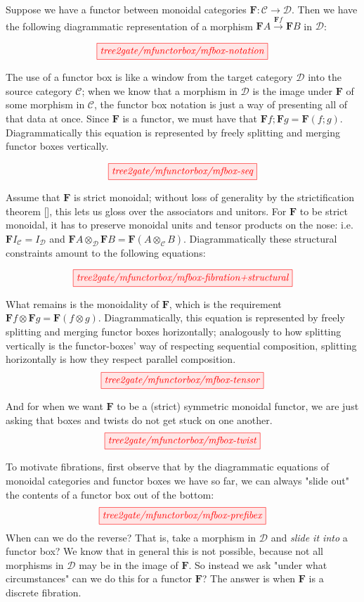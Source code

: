\begin{fullwidth}
Suppose we have a functor between monoidal categories $\mathbf{F}: \mathcal{C} \rightarrow \mathcal{D}$. Then we have the following diagrammatic representation of a morphism $\mathbf{F}A \overset{\mathbf{F}f}{\rightarrow} \mathbf{F}B$ in $\mathcal{D}$:

\[\tikzfig{tree2gate/mfunctorbox/mfbox-notation}\]

The use of a functor box is like a window from the target category $\mathcal{D}$ into the source category $\mathcal{C}$; when we know that a morphism in $\mathcal{D}$ is the image under $\mathbf{F}$ of some morphism in $\mathcal{C}$, the functor box notation is just a way of presenting all of that data at once. Since $\mathbf{F}$ is a functor, we must have that $\mathbf{F}f ; \mathbf{F}g = \mathbf{F}(f;g)$. Diagrammatically this equation is represented by freely splitting and merging functor boxes vertically.

\[\tikzfig{tree2gate/mfunctorbox/mfbox-seq}\]

Assume that $\mathbf{F}$ is strict monoidal; without loss of generality by the strictification theorem [], this lets us gloss over the associators and unitors. For $\mathbf{F}$ to be strict monoidal, it has to preserve monoidal units and tensor products on the nose: i.e. $\mathbf{F}I_\mathcal{C} = I_\mathcal{D}$ and $\mathbf{F}A \otimes_\mathcal{D} \mathbf{F}B = \mathbf{F}(A \otimes_\mathcal{C} B)$. Diagrammatically these structural constraints amount to the following equations:

\[\tikzfig{tree2gate/mfunctorbox/mfbox-fibration+structural}\]

What remains is the monoidality of $\mathbf{F}$, which is the requirement $\mathbf{F}f \otimes \mathbf{F}g = \mathbf{F}(f \otimes g)$. Diagrammatically, this equation is represented by freely splitting and merging functor boxes horizontally; analogously to how splitting vertically is the functor-boxes' way of respecting sequential composition, splitting horizontally is how they respect parallel composition.
\[\tikzfig{tree2gate/mfunctorbox/mfbox-tensor}\]

And for when we want $\mathbf{F}$ to be a (strict) symmetric monoidal functor, we are just asking that boxes and twists do not get stuck on one another.
\[\tikzfig{tree2gate/mfunctorbox/mfbox-twist}\]

\begin{remark}
To motivate fibrations, first observe that by the diagrammatic equations of monoidal categories and functor boxes we have so far, we can always "slide out" the contents of a functor box out of the bottom:
\[\tikzfig{tree2gate/mfunctorbox/mfbox-prefibex}\]
When can we do the reverse? That is, take a morphism in $\mathcal{D}$ and \emph{slide it into} a functor box? We know that in general this is not possible, because not all morphisms in $\mathcal{D}$ may be in the image of $\mathbf{F}$. So instead we ask "under what circumstances" can we do this for a functor $\mathbf{F}$? The answer is when $\mathbf{F}$ is a discrete fibration.
\end{remark}


\end{fullwidth}
